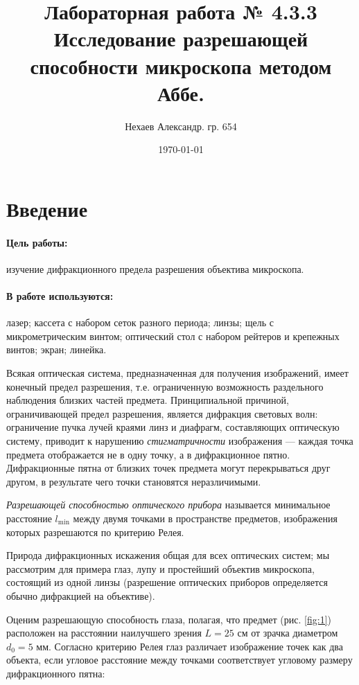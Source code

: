 \documentclass[a4paper, 12pt]{article}
\title{Лабораторная работа № 4.3.3\\Исследование разрешающей способности микроскопа методом Аббе.}
\author{Нехаев Александр. гр. 654}
\date{\today}
\begin{document}
	\maketitle
	\newpage
	\tableofcontents
	\newpage
	\section{Введение}
	\paragraph{Цель работы:} изучение дифракционного предела разрешения объектива микроскопа.
	\paragraph{В работе используются:} лазер; кассета с набором сеток разного периода; линзы; щель с микрометрическим винтом; оптический стол с набором рейтеров и крепежных винтов; экран; линейка.\par
	Всякая оптическая система, предназначенная для получения изображений, имеет конечный предел разрешения, т.е. ограниченную возможность раздельного наблюдения близких частей предмета. Принципиальной причиной, ограничивающей предел разрешения, является дифракция световых волн: ограничение пучка лучей краями линз и диафрагм, составляющих оптическую систему, приводит к нарушению \textit{стигматричности} изображения — каждая точка предмета отображается не в одну точку, а в дифракционное пятно. Дифракционные пятна от близких точек предмета могут перекрываться друг другом, в результате чего точки становятся неразличимыми.\par
	\textit{Разрешающей способностью оптического прибора} называется минимальное расстояние $l_{\min}$ между двумя точками в пространстве предметов, изображения которых разрешаются по критерию Релея.\par
	Природа дифракционных искажения общая для всех оптических систем; мы рассмотрим для примера глаз, лупу и простейший объектив микроскопа, состоящий из одной линзы (разрешение оптических приборов определяется обычно дифракцией на объективе).\par
	Оценим разрешающую способность глаза, полагая, что предмет (рис. \ref{fig:1}) расположен на расстоянии наилучшего зрения $L=25$ см от зрачка диаметром $d_0=5$ мм. Согласно критерию Релея глаз различает изображение точек как два объекта, если угловое расстояние между точками соответствует угловому размеру дифракционного пятна:
\end{document}
